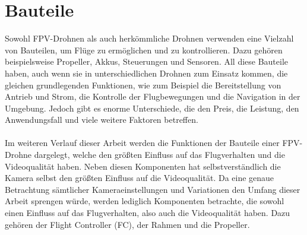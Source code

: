 
\section[Bauteile]{Bauteile}
    Sowohl FPV-Drohnen als auch herkömmliche Drohnen verwenden eine Vielzahl von Bauteilen,
    um Flüge zu ermöglichen und zu kontrollieren. Dazu gehören beispielsweise Propeller, Akkus,
    Steuerungen und Sensoren. All diese Bauteile haben, auch wenn sie in unterschiedlichen
    Drohnen zum Einsatz kommen, die gleichen grundlegenden Funktionen, wie zum Beispiel die
    Bereitstellung von Antrieb und Strom, die Kontrolle der Flugbewegungen und die Navigation
    in der Umgebung. Jedoch gibt es enorme Unterschiede, die den Preis, die Leistung, den
    Anwendungsfall und viele weitere Faktoren betreffen. \\
    \\
    Im weiteren Verlauf dieser Arbeit werden die Funktionen der Bauteile einer FPV-Drohne
    dargelegt, welche den größten Einfluss auf das Flugverhalten und die Videoqualität haben.
    Neben diesen Komponenten hat selbstverständlich die Kamera selbst den größten Einfluss auf
    die Videoqualität. Da eine genaue Betrachtung sämtlicher Kameraeinstellungen und Variationen
    den Umfang dieser Arbeit sprengen würde, werden lediglich Komponenten betrachte, die sowohl
    einen Einfluss auf das Flugverhalten, also auch die Videoqualität haben. Dazu gehören der
    Flight Controller (FC), der Rahmen und die Propeller.
   
